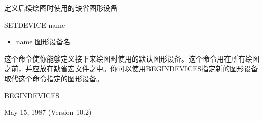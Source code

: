 \label{cmd:setdevice}

定义后续绘图时使用的缺省图形设备

SETDEVICE name

\begin{itemize}
\item name 图形设备名
\end{itemize}

这个命令使你能够定义接下来绘图时使用的默认图形设备。这个命令用在所有绘图之前，并应放在缺省宏文件之中。你可以使用BEGINDEVICES指定新的图形设备取代这个命令指定的图形设备。

BEGINDEVICES

May 15, 1987 (Version 10.2)
